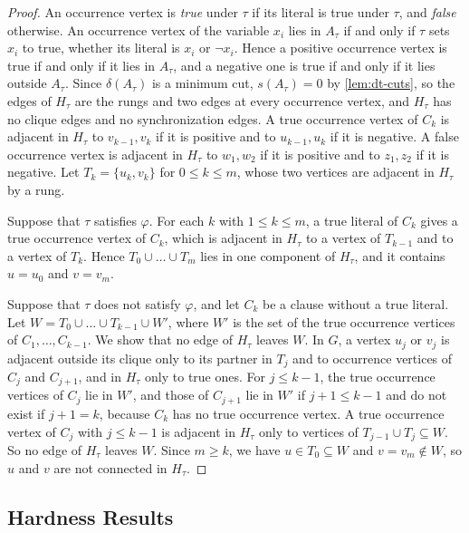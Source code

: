 \documentclass[pdflatex,sn-mathphys-num]{sn-jnl}%
\theoremstyle{thmstyleone}%
\theoremstyle{thmstyletwo}%
\theoremstyle{thmstylethree}%
\begin{document}
\begin{proof}
An occurrence vertex is \emph{true} under $\tau$ if its literal is true under $\tau$, and \emph{false} otherwise.
An occurrence vertex of the variable $x_i$ lies in $A_\tau$ if and only if $\tau$ sets $x_i$ to true, whether its literal is $x_i$ or $\neg x_i$.
Hence a positive occurrence vertex is true if and only if it lies in $A_\tau$, and a negative one is true if and only if it lies outside $A_\tau$.
Since $\delta(A_\tau)$ is a minimum cut, $s(A_\tau) = 0$ by \cref{lem:dt-cuts}, so the edges of $H_\tau$ are the rungs and two edges at every occurrence vertex, and $H_\tau$ has no clique edges and no synchronization edges.
A true occurrence vertex of $C_k$ is adjacent in $H_\tau$ to $v_{k-1}, v_k$ if it is positive and to $u_{k-1}, u_k$ if it is negative.
A false occurrence vertex is adjacent in $H_\tau$ to $w_1, w_2$ if it is positive and to $z_1, z_2$ if it is negative.
Let $T_k = \{u_k, v_k\}$ for $0 \leq k \leq m$, whose two vertices are adjacent in $H_\tau$ by a rung.

Suppose that $\tau$ satisfies $\varphi$.
For each $k$ with $1 \leq k \leq m$, a true literal of $C_k$ gives a true occurrence vertex of $C_k$, which is adjacent in $H_\tau$ to a vertex of $T_{k-1}$ and to a vertex of $T_k$.
Hence $T_0 \cup \dots \cup T_m$ lies in one component of $H_\tau$, and it contains $u = u_0$ and $v = v_m$.

Suppose that $\tau$ does not satisfy $\varphi$, and let $C_k$ be a clause without a true literal.
Let $W = T_0 \cup \dots \cup T_{k-1} \cup W'$, where $W'$ is the set of the true occurrence vertices of $C_1, \dots, C_{k-1}$.
We show that no edge of $H_\tau$ leaves $W$.
In $G$, a vertex $u_j$ or $v_j$ is adjacent outside its clique only to its partner in $T_j$ and to occurrence vertices of $C_j$ and $C_{j+1}$, and in $H_\tau$ only to true ones.
For $j \leq k - 1$, the true occurrence vertices of $C_j$ lie in $W'$, and those of $C_{j+1}$ lie in $W'$ if $j + 1 \leq k - 1$ and do not exist if $j + 1 = k$, because $C_k$ has no true occurrence vertex.
A true occurrence vertex of $C_j$ with $j \leq k - 1$ is adjacent in $H_\tau$ only to vertices of $T_{j-1} \cup T_j \subseteq W$.
So no edge of $H_\tau$ leaves $W$.
Since $m \geq k$, we have $u \in T_0 \subseteq W$ and $v = v_m \notin W$, so $u$ and $v$ are not connected in $H_\tau$.
\end{proof}

\subsection{Hardness Results}
\label{sec:dt-results}
\end{document}
